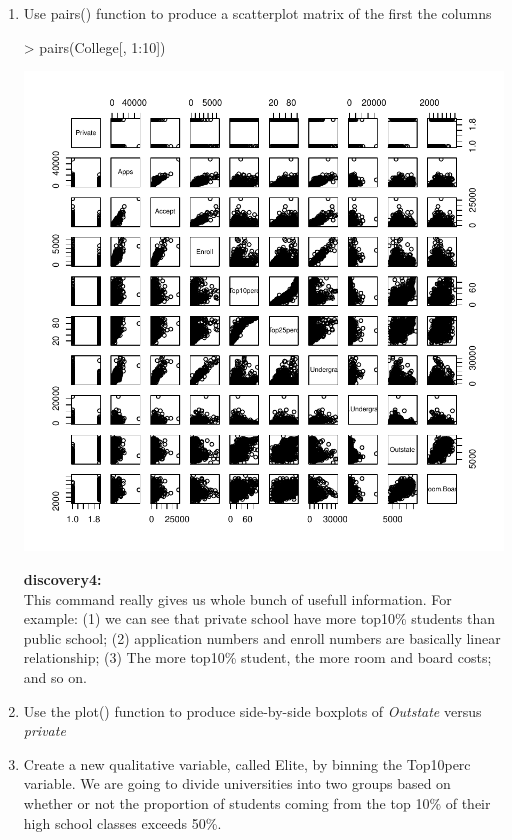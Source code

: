 \documentclass[a4paper]{article}
\begin{document}
\begin{enumerate}
\item Use pairs() function to produce a scatterplot matrix of the first the columns
\begin{Schunk}
\begin{Sinput}
> pairs(College[, 1:10])
\end{Sinput}
\end{Schunk}
\includegraphics{introduction-pairs}

{
\colorbox{BurntOrange}{\textbf{discovery4:}}\color{red}\\
This command really gives us whole bunch of usefull information. For example: (1) we can see that private school have more top10\% students than public school; (2) application numbers and enroll numbers are basically linear relationship; (3) The more top10\% student, the more room and board costs; and so on.
}


\item Use the plot() function to produce side-by-side boxplots of \textit{Outstate} versus \textit{private}

\item Create a new qualitative variable, called Elite, by binning the Top10perc variable. We are going to divide universities into two groups based on whether or not the proportion of students coming from the top 10\% of their high school classes exceeds 50\%.


\end{enumerate}
\end{document}
